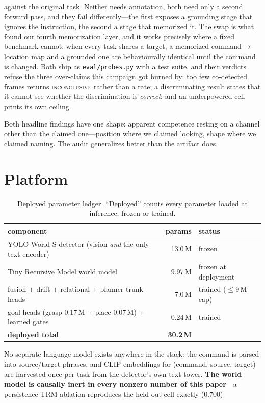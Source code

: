 \documentclass[10pt,letterpaper]{article}
\begin{document}
\begin{enumerate}
{against the original task}. Neither needs annotation, both need only a second
forward pass, and they fail differently---the first exposes a grounding stage
that ignores the instruction, the second a stage that memorized it. The swap is
what found our fourth memorization layer, and it works precisely where a fixed
benchmark cannot: when every task shares a target, a memorized
command$\to$location map and a grounded one are behaviourally identical until
the command is changed. Both ship as \texttt{eval/probes.py} with a test suite,
and their verdicts refuse the three over-claims this campaign got burned by:
too few co-detected frames returns \textsc{inconclusive} rather than a rate; a
discriminating result states that it cannot see whether the discrimination is
\emph{correct}; and an underpowered cell prints its own ceiling.
\end{enumerate}

\noindent Both headline findings have one shape: apparent competence resting on
a channel other than the claimed one---position where we claimed looking, shape
where we claimed naming. The audit generalizes better than the artifact does.

\section{Platform}

\begin{table}[h]\centering\small
\caption{Deployed parameter ledger. ``Deployed'' counts every parameter loaded
at inference, frozen or trained.}
\begin{tabular}{lrl}
\toprule
component & params & status \\
\midrule
YOLO-World-S detector (vision \emph{and} the only text encoder) & 13.0\,M & frozen \\
Tiny Recursive Model world model & 9.97\,M & frozen at deployment \\
fusion + drift + relational + planner trunk heads & 7.0\,M & trained ($\le$9\,M cap) \\
goal heads (grasp 0.17\,M + place 0.07\,M) + learned gates & 0.24\,M & trained \\
\midrule
\textbf{deployed total} & \textbf{30.2\,M} & \\
\bottomrule
\end{tabular}
\end{table}

No separate language model exists anywhere in the stack: the command is parsed
into source/target phrases, and CLIP embeddings for (command, source, target)
are harvested once per task from the detector's own text tower. \textbf{The
world model is causally inert in every nonzero number of this paper}---a
persistence-TRM ablation reproduces the held-out cell exactly (0.700).
\end{document}
